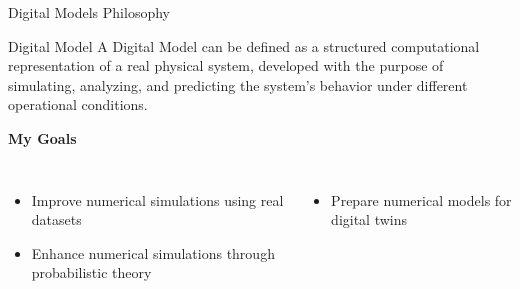 \begin{frame}{Digital Models Philosophy}

\begin{block}{Digital Model}
\justifying
A Digital Model can be defined as a structured computational representation of a real physical system,
developed with the purpose of simulating, analyzing, and predicting the system’s behavior under different
operational conditions.
\end{block}

\vspace{0.3cm}

\textbf{My Goals}

\begin{columns}[T,onlytextwidth]
  \begin{itemize}
    \item Improve numerical simulations using real datasets
    \item Enhance numerical simulations through probabilistic theory
  \end{itemize}

  \begin{itemize}
    \item Prepare numerical models for digital twins
  \end{itemize}
\end{columns}

\end{frame}
